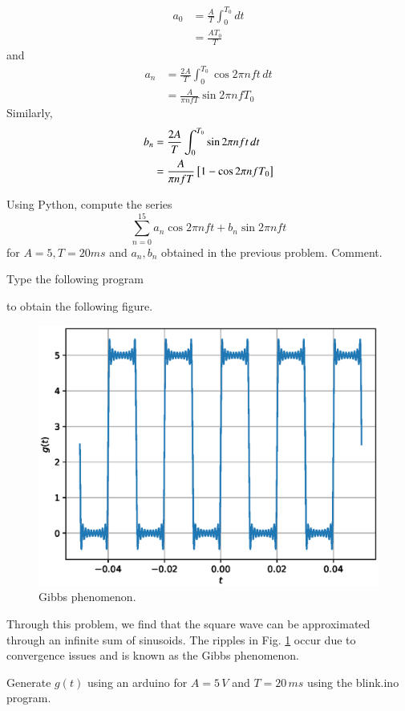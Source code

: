 %
\solution 
\begin{align}
a_0 &= \frac{A}{T} \int_{0}^{T_0}  dt \\
&= \frac{AT_0}{T}
\end{align}
and
\begin{align}
a_n &= \frac{2A}{T} \int_{0}^{T_0}\cos 2\pi nf t \,  dt \\
&= \frac{A}{\pi n f T }\sin 2\pi n f T_0
\end{align}
Similarly, 
\begin{align}
b_n &= \frac{2A}{T} \int_{0}^{T_0}\sin 2\pi nf t \,  dt \\
&= \frac{A}{\pi n f T }{}\left[1 - \cos 2\pi n f T_0\right]
\end{align}

%
\begin{problem}
Using Python, compute the series 
%
\begin{equation}
\sum_{n=0}^{15}a_n\cos 2\pi n f t + b_n \sin 2 \pi n f t
\end{equation}
%
for $A=5, T= 20 ms$ and $a_n,b_n$ obtained in the previous problem.  Comment.
%
\label{fourier_series}
\end{problem}
\solution  Type the following program
%

to obtain the following figure.
\begin{figure}[!h]
\centering

\includegraphics[width=\columnwidth]{./chapter1/figs/1.4.eps}
\caption{Gibbs phenomenon.}
\label{fig:1.4}
\end{figure}
%
Through this problem, we find that the square wave can be approximated through an infinite sum of sinusoids. The ripples in Fig. \ref{fig:1.4} occur due to convergence issues and is known as the Gibbs phenomenon.
\begin{problem}
  Generate $g(t)$ using an arduino for $A = 5\, V$ and $T = 20 \, ms$ using the blink.ino program.
  \end{problem}
%



